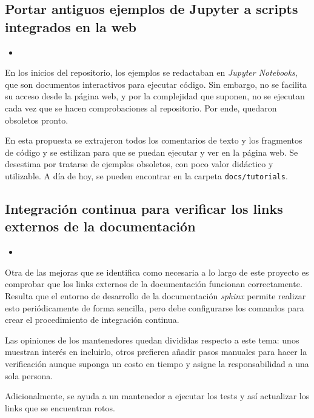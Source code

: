 \subsection{Portar antiguos ejemplos de Jupyter a scripts integrados en la web}

\begin{itemize}
    \item {}
\end{itemize}

En los inicios del repositorio, los ejemplos se redactaban en \textit{Jupyter Notebooks}, que son documentos interactivos para ejecutar código. Sin embargo, no se facilita su acceso desde la página web, y por la complejidad que suponen, no se ejecutan cada vez que se hacen comprobaciones al repositorio. Por ende, quedaron obsoletos pronto.

En esta propuesta se extrajeron todos los comentarios de texto y los fragmentos de código y se estilizan para que se puedan ejecutar y ver en la página web. Se desestima por tratarse de ejemplos obsoletos, con poco valor didáctico y utilizable. A día de hoy, se pueden encontrar en la carpeta \texttt{docs/tutorials}.

\subsection{Integración continua para verificar los links externos de la documentación}

\begin{itemize}
    \item {}
\end{itemize}

Otra de las mejoras que se identifica como necesaria a lo largo de este proyecto es comprobar que los links externos de la documentación funcionan correctamente. Resulta que el entorno de desarrollo de la documentación \textit{sphinx} permite realizar esto periódicamente de forma sencilla, pero debe configurarse los comandos para crear el procedimiento de integración continua.

Las opiniones de los mantenedores quedan divididas respecto a este tema: unos muestran interés en incluirlo, otros prefieren añadir pasos manuales para hacer la verificación aunque suponga un costo en tiempo y asigne la responsabilidad a una sola persona.

Adicionalmente, se ayuda a un mantenedor a ejecutar los tests y así actualizar los links que se encuentran rotos.

